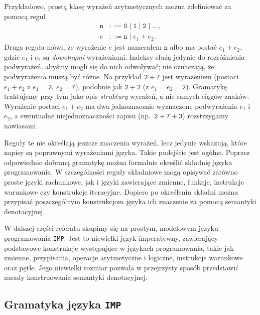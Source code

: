\documentclass[11pt,a4paper]{article}
\theoremstyle{definition}
\theoremstyle{plain}
\begin{document}
Przykładowo, prostą klasę wyrażeń arytmetycznych można zdefiniować za pomocą
reguł
\[
\begin{aligned}
	\mathtt{n} &::= \mathtt{0} \mid \mathtt{1} \mid \mathtt{2} \mid \ldots,\\
	e &::= \mathtt{n} \mid e_1 + e_2.
\end{aligned}
\]
Druga reguła mówi, że wyrażenie $e$ jest numerałem $\mathtt{n}$ albo ma postać $e_1+e_2$,
gdzie $e_1$ i $e_2$ są \emph{dowolnymi} wyrażeniami. Indeksy służą jedynie do
rozróżnienia podwyrażeń, abyśmy mogli się do nich odwoływać; nie oznaczają, że
podwyrażenia muszą być różne. Na przykład $\mathtt{2+7}$ jest wyrażeniem
(postaci $e_1+e_2$ z $e_1=\mathtt{2}$, $e_2=\mathtt{7}$), podobnie jak
$\mathtt{2+2}$ (z $e_1=e_2=\mathtt{2}$). Gramatykę traktujemy przy tym jako opis
\emph{struktury} wyrażeń, a nie samych ciągów znaków. Wyrażenie postaci
$e_1+e_2$ ma dwa jednoznacznie wyznaczone podwyrażenia $e_1$ i $e_2$, a ewentualne
niejednoznaczności zapisu (np.\ $\mathtt{2+7+3}$) rozstrzygamy nawiasami.

Reguły te nie określają jeszcze znaczenia wyrażeń, lecz jedynie wskazują,
które napisy są poprawnymi wyrażeniami języka. Takie podejście jest ogólne.
Poprzez odpowiednio dobraną gramatykę można formalnie określić składnię języka
programowania. W szczególności reguły składniowe mogą opisywać zarówno proste
języki rachunkowe, jak i języki zawierające zmienne, funkcje, instrukcje
warunkowe czy konstrukcje iteracyjne. Dopiero po określeniu składni można
przypisać poszczególnym konstrukcjom języka ich znaczenie za pomocą semantyki
denotacyjnej.

W dalszej części referatu skupimy się na prostym, modelowym języku
programowania \texttt{IMP}. Jest to niewielki język imperatywny, zawierający
podstawowe konstrukcje występujące w językach programowania, takie jak
zmienne, przypisania, operacje arytmetyczne i logiczne, instrukcje warunkowe
oraz pętle. Jego niewielki rozmiar pozwala w przejrzysty sposób przedstawić
zasady konstruowania semantyki denotacyjnej.

\subsection{Gramatyka języka \texttt{IMP}}
\end{document}
